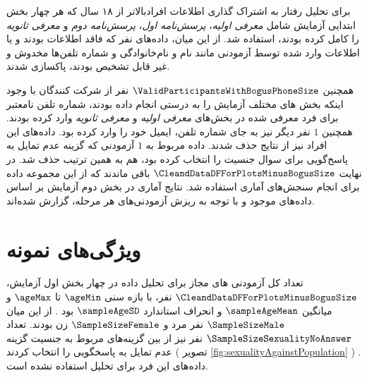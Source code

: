 برای تحلیل رفتار به اشتراک گذاری اطلاعات افرادبالاتر از ۱۸ سال که هر چهار بخش ابتدایی آزمایش شامل
\textit{معرفی اولیه}،
\textit{پرسش‌نامه اول}،
\textit{پرسش‌نامه دوم} و
\textit{معرفی ثانویه}
را کامل کرده بودند، استفاده شد.
از این میان، داده‌های
\BogusEmailDataBogusNoLandingPageDateData
نفر
که فاقد اطلاعات بودند و یا اطلاعات وارد شده توسط آزمودنی
مانند نام و نام‌خانوادگی و شماره تلفن‌ها مخدوش و غیر قابل تشخیص بودند، پاکسازی شدند.

 همچنین
$\ValidParticipantsWithBogusPhoneSize$
نفر  از شرکت کنندگان با وجود اینکه
بخش های مختلف آزمایش را به درستی انجام داده بودند، شماره تلفن نامعتبر
برای فرد معرفی شده در بخش‌های
\textit{معرفی اولیه}
و
\textit{معرفی ثانویه}
وارد کرده بودند. همچنین
$1$
نفر دیگر نیز به جای شماره تلفن، ایمیل خود را وارد کرده بود. داده‌های این افراد نیز از نتایج حذف شدند.
داده مربوط به 
$1$
آزمودنی که گزینه عدم تمایل به پاسخ‌گویی برای سوال جنسیت را انتخاب کرده بود، هم به همین ترتیب حذف شد.
در نهایت
$\CleandDataDFForPlotsMinusBogusSize$
باقی ماندند که از این مجموعه داده برای انجام سنجش‌های آماری استفاده شد.
نتایج آماری در بخش دوم آزمایش بر اساس داده‌های موجود و با توجه به ریزش آزمودنی‌های هر مرحله، گزارش شده‌اند.
\section{ویژگی‌های نمونه}
تعداد کل آزمودنی های مجاز برای تحلیل داده در چهار بخش اول آزمایش،
$\CleandDataDFForPlotsMinusBogusSize$
نفر،
با بازه سنی
$\ageMin$
تا
$\ageMax$
و
میانگین
$\sampleAgeMean$
و انحراف استاندارد
$\sampleAgeSD$
بود
\!.
از این میان
$\SampleSizeMale$
نفر مرد و
$\SampleSizeFemale$
زن بودند.
تعداد
$\SampleSizeSexualityNoAnswer$
نفر
نیز از بین گزینه‌های مربوط به جنسیت گزینه عدم تمایل به پاسخگویی را انتخاب کردند
(
تصویر \ref{fig:sexualityAgainstPopulation}
)
\!. 
داده‌های این فرد برای تحلیل‌ استفاده نشده است.


% 


